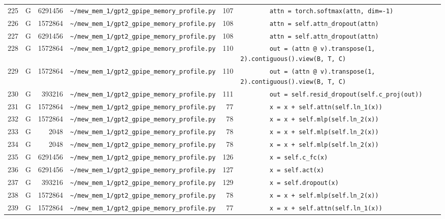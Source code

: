 \documentclass{article}
\begin{document}
\begin{longtable}{r l r p{6.5cm} r p{7.0cm}}
225 & G & 6291456 & \lstinline|~/mew_mem_1/gpt2_gpipe_memory_profile.py| & 107 & \lstinline|        attn = torch.softmax(attn, dim=-1)| \\
226 & G & 1572864 & \lstinline|~/mew_mem_1/gpt2_gpipe_memory_profile.py| & 108 & \lstinline|        attn = self.attn_dropout(attn)| \\
227 & G & 6291456 & \lstinline|~/mew_mem_1/gpt2_gpipe_memory_profile.py| & 108 & \lstinline|        attn = self.attn_dropout(attn)| \\
228 & G & 1572864 & \lstinline|~/mew_mem_1/gpt2_gpipe_memory_profile.py| & 110 & \lstinline|        out = (attn @ v).transpose(1, 2).contiguous().view(B, T, C)| \\
229 & G & 1572864 & \lstinline|~/mew_mem_1/gpt2_gpipe_memory_profile.py| & 110 & \lstinline|        out = (attn @ v).transpose(1, 2).contiguous().view(B, T, C)| \\
230 & G & 393216 & \lstinline|~/mew_mem_1/gpt2_gpipe_memory_profile.py| & 111 & \lstinline|        out = self.resid_dropout(self.c_proj(out))| \\
231 & G & 1572864 & \lstinline|~/mew_mem_1/gpt2_gpipe_memory_profile.py| & 77 & \lstinline|        x = x + self.attn(self.ln_1(x))| \\
232 & G & 1572864 & \lstinline|~/mew_mem_1/gpt2_gpipe_memory_profile.py| & 78 & \lstinline|        x = x + self.mlp(self.ln_2(x))| \\
233 & G & 2048 & \lstinline|~/mew_mem_1/gpt2_gpipe_memory_profile.py| & 78 & \lstinline|        x = x + self.mlp(self.ln_2(x))| \\
234 & G & 2048 & \lstinline|~/mew_mem_1/gpt2_gpipe_memory_profile.py| & 78 & \lstinline|        x = x + self.mlp(self.ln_2(x))| \\
235 & G & 6291456 & \lstinline|~/mew_mem_1/gpt2_gpipe_memory_profile.py| & 126 & \lstinline|        x = self.c_fc(x)| \\
236 & G & 6291456 & \lstinline|~/mew_mem_1/gpt2_gpipe_memory_profile.py| & 127 & \lstinline|        x = self.act(x)| \\
237 & G & 393216 & \lstinline|~/mew_mem_1/gpt2_gpipe_memory_profile.py| & 129 & \lstinline|        x = self.dropout(x)| \\
238 & G & 1572864 & \lstinline|~/mew_mem_1/gpt2_gpipe_memory_profile.py| & 78 & \lstinline|        x = x + self.mlp(self.ln_2(x))| \\
239 & G & 1572864 & \lstinline|~/mew_mem_1/gpt2_gpipe_memory_profile.py| & 77 & \lstinline|        x = x + self.attn(self.ln_1(x))| \\

\end{longtable}
\end{document}
